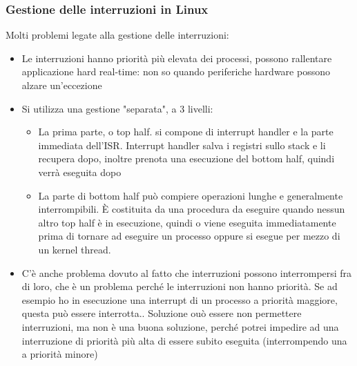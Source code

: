 \documentclass[12pt, oneside]{extbook}
\begin{document}
\subsubsection{Gestione delle interruzioni in Linux}
Molti problemi legate alla gestione delle interruzioni:
\begin{itemize}
\item Le interruzioni hanno priorità più elevata dei processi, possono rallentare applicazione hard real-time: non so quando periferiche hardware possono alzare un'eccezione
\item Si utilizza una gestione "separata", a 3 livelli:
\begin{itemize}
\item La prima parte, o top half. si compone di interrupt handler e la parte immediata dell'ISR. Interrupt handler salva i registri sullo stack e li recupera dopo, inoltre prenota una esecuzione del bottom half, quindi verrà eseguita dopo
\item La parte di bottom half può compiere operazioni lunghe e generalmente interrompibili. È costituita da una procedura da eseguire quando nessun altro top half è in esecuzione, quindi o viene eseguita immediatamente prima di tornare ad eseguire un processo oppure si esegue per mezzo di un kernel thread.
\end{itemize}
\item C'è anche problema dovuto al fatto che interruzioni possono interrompersi fra di loro, che è un problema perché le interruzioni non hanno priorità. Se ad esempio ho in esecuzione una interrupt di un processo a priorità maggiore, questa può essere interrotta.. Soluzione ouò essere non permettere interruzioni, ma non è una buona soluzione, perché potrei impedire ad una interruzione di priorità più alta di essere subito eseguita (interrompendo una a priorità minore)
\end{itemize}
\end{document}
